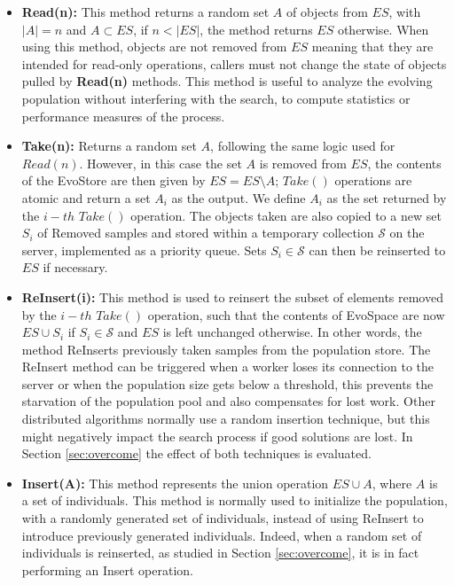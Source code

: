 \begin{itemize}
 \item \textbf{Read(n):} This method returns a random set $A$ of objects from $ES$, with $|A|=n$ and $A\subset ES$, if $n< |ES|$, the method returns $ES$ otherwise. When using this method, objects are not removed from $ES$ meaning that they are intended for read-only operations, callers must not change the state of objects pulled by \textbf{Read(n)} methods. This method is useful to analyze the evolving population without interfering with the search, to compute statistics or performance measures of the process.

\item \textbf{Take(n):} Returns a random set $A$, following the same logic used for $Read(n)$. However, in this case the set $A$ is removed from $ES$, the contents of the EvoStore are then given by $ES = ES \setminus A$;  $Take()$ operations are atomic and return a set $A_i$ as the output. We define  $A_i$ as the set returned by the $i-th$ $Take()$ operation. The objects taken are also copied to a new set $S_i$ of Removed samples and stored
within a temporary collection $\mathcal{S}$ on the server, implemented as a priority queue. Sets $S_i \in \mathcal{S}$ can then be reinserted to $ES$ if necessary.  
 
 \item \textbf{ReInsert(i):} This method is used to reinsert the subset of elements removed by the $i-th$ $Take()$ operation,
  such that the contents of EvoSpace are now $ES \cup S_i$ if $S_i \in \mathcal{S}$ and $ES$ is left unchanged otherwise.
  In other words, the method ReInserts previously taken samples from the population store.
  The ReInsert method can be triggered when a worker loses its connection to the server or when the population size gets below a threshold, this prevents the starvation
  of the population pool and also compensates for lost work. Other distributed algorithms normally use a random insertion technique, but this might negatively impact the search process if good solutions are lost. In Section \ref{sec:overcome} the effect of both techniques is evaluated.
      
 \item \textbf{Insert(A):} This method represents the union operation $ES \cup A$, where $A$ is a set of individuals.
 This method is normally used to initialize the population, with a randomly generated set of individuals, instead of using ReInsert to introduce previously
 generated individuals. Indeed, when a random set of individuals is reinserted, as studied in Section \ref{sec:overcome}, it is in fact performing an Insert operation.


\end{itemize}
